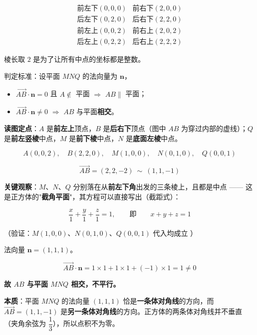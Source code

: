 \[\begin{array}{ll}
\text{前左下}(0,0,0) & \text{前右下}(2,0,0)\\
\text{后左下}(0,2,0) & \text{后右下}(2,2,0)\\
\text{前左上}(0,0,2) & \text{前右上}(2,0,2)\\
\text{后左上}(0,2,2) & \text{后右上}(2,2,2)
\end{array}\]

棱长取 $2$ 是为了让所有中点的坐标都是整数。

判定标准：设平面 $MNQ$ 的法向量为 $\boldsymbol n$，

\begin{itemize}
\item $\overrightarrow{AB}\cdot\boldsymbol n=0$ 且 $A\notin$ 平面 $\Rightarrow$ $AB\parallel$ 平面；
\item $\overrightarrow{AB}\cdot\boldsymbol n\ne0$ $\Rightarrow$ $AB$ 与平面\textbf{相交}。
\end{itemize}

\par\medskip


\textbf{读图定点}：$A$ 是\textbf{前左上}顶点，$B$ 是\textbf{后右下}顶点（图中 $AB$ 为穿过内部的虚线）；$Q$ 是\textbf{前左竖棱}中点，$M$ 是\textbf{前下棱}中点，$N$ 是\textbf{底面左棱}中点。

\[A(0,0,2),\quad B(2,2,0),\quad M(1,0,0),\quad N(0,1,0),\quad Q(0,0,1)\]

\[\overrightarrow{AB}=(2,2,-2)\ \sim\ (1,1,-1)\]

\textbf{关键观察}：$M$、$N$、$Q$ 分别落在从\textbf{前左下角}出发的三条棱上，且都是中点 —— 这是正方体的"\textbf{截角平面}"，其方程可以直接写出（截距式）：

\[\frac x1+\frac y1+\frac z1=1,\qquad\text{即}\qquad x+y+z=1\]

（验证：$M(1,0,0)$、$N(0,1,0)$、$Q(0,0,1)$ 代入均成立 ）

法向量 $\boldsymbol n=(1,1,1)$。

\[\overrightarrow{AB}\cdot\boldsymbol n=1\times1+1\times1+(-1)\times1=1\ne0\]

\textbf{故 $AB$ 与平面 $MNQ$ 相交，不平行。}

\begin{gktip}
\textbf{本质}：平面 $MNQ$ 的法向量 $(1,1,1)$ 恰是\textbf{一条体对角线}的方向，而 $\overrightarrow{AB}=(1,1,-1)$ 是\textbf{另一条体对角线}的方向。正方体的两条体对角线并不垂直（夹角余弦为 $\dfrac13$），所以点积不为零。
\end{gktip}

